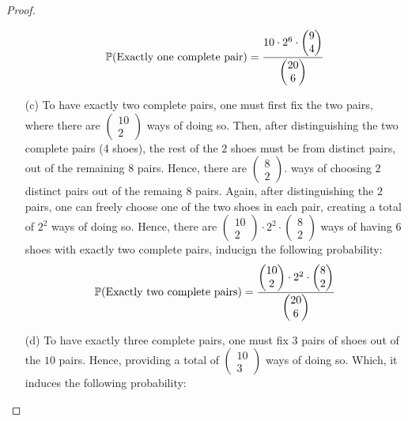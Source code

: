 \documentclass{article}
\begin{document}
\begin{proof}
\begin{itemize}
        \begin{align}
            \mathbb{P}(\textmd{Exactly one complete pair})=\frac{10\cdot 2^6\cdot \begin{pmatrix}9\\4\end{pmatrix}}{\begin{pmatrix}20\\6\end{pmatrix}}
        \end{align}
        \item[(c)] To have exactly two complete pairs, one must first fix the two pairs, where there are $\begin{pmatrix}10\\2\end{pmatrix}$ ways of doing so. Then, after distinguishing the two complete pairs (4 shoes), the rest of the $2$ shoes must be from distinct pairs, out of the remaining $8$ pairs. Hence, there are $\begin{pmatrix}8\\2\end{pmatrix}$. ways of choosing $2$ distinct pairs out of the remaing $8$ pairs. Again, after distinguishing the $2$ pairs, one can freely choose one of the two shoes in each pair, creating a total of $2^2$ ways of doing so. Hence, there are $\begin{pmatrix}10\\2\end{pmatrix}\cdot 2^2\cdot \begin{pmatrix}8\\2\end{pmatrix}$ ways of having $6$ shoes with exactly two complete pairs, inducign the following probability:
        \begin{align}
            \mathbb{P}(\textmd{Exactly two complete pairs})=\frac{\begin{pmatrix}10\\2\end{pmatrix}\cdot 2^2\cdot \begin{pmatrix}8\\2\end{pmatrix}}{\begin{pmatrix}20\\6\end{pmatrix}}
        \end{align}
        \item[(d)] To have exactly three complete pairs, one must fix $3$ pairs of shoes out of the $10$ pairs. Hence, providing a total of $\begin{pmatrix}10\\3\end{pmatrix}$ ways of doing so. Which, it induces the following probability:

\end{itemize}
\end{proof}
\end{document}

